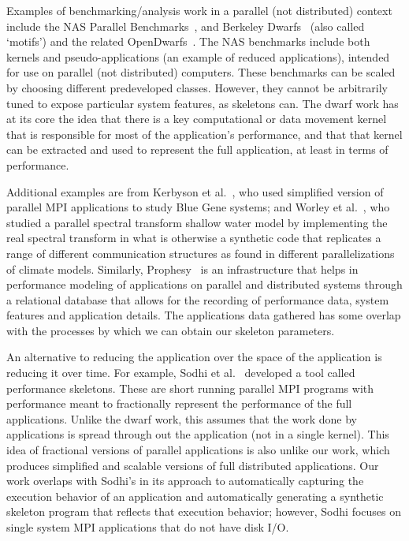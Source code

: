 \documentclass[preprint,12pt]{elsarticle}
\begin{document}
Examples of benchmarking/analysis work in a parallel (not distributed) context
include the NAS Parallel Benchmarks~\cite{NPB}, and Berkeley
Dwarfs~\cite{dwarfs} (also called `motifs') and the related
OpenDwarfs~\cite{6868650}.  The NAS benchmarks include both kernels and
pseudo-applications (an example of reduced applications), intended for use on
parallel (not distributed) computers.  These benchmarks can be scaled by
choosing different predeveloped classes.  However, they cannot be arbitrarily
tuned to expose particular system features, as skeletons can.  The dwarf work
has at its core the idea that there is a key computational or data movement
kernel that is responsible for most of the application's performance, and that
that kernel can be extracted and used to represent the full application, at
least in terms of performance.

Additional examples are from Kerbyson et
al.~\cite{Kerbyson_SC13}, who used simplified version of parallel MPI applications
to study Blue Gene systems; and Worley et al.~\cite{Worley1994,FosterWorley1997}, 
who studied a parallel spectral transform shallow water model by implementing the
real spectral transform in what is otherwise a synthetic code that replicates a
range of different communication structures as found in different parallelizations
of climate models.  Similarly, Prophesy~\cite{Taylor_HPDC2000} is an infrastructure that helps in performance modeling of applications on parallel and distributed systems through a relational database that allows for the recording of performance data, system features and application details.  The applications data gathered has some overlap with the processes by which we can obtain our skeleton parameters.

An alternative to reducing the application over the space of the application is
reducing it over time.  For example, Sodhi et
al.~\cite{Sodhi:2008:PPS:1355774.1355777} developed a tool called performance
skeletons.  These are short running parallel MPI programs with performance meant
to fractionally represent the performance of the full applications.  Unlike the
dwarf work, this assumes that the work done by applications is spread through
out the application (not in a single kernel).  This idea of fractional versions
of parallel applications is also unlike our work, which produces simplified and
scalable versions of full distributed applications.  Our work overlaps with
Sodhi's in its approach to automatically
capturing the execution behavior of an application and automatically generating
a synthetic skeleton program that reflects that execution behavior; however,
Sodhi focuses on single system MPI
applications that do not have disk I/O.
\end{document}
